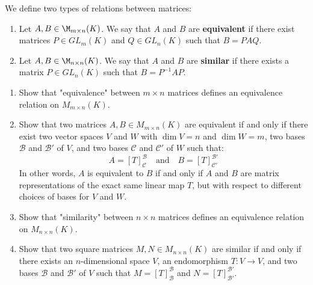 \begin{definition}
\label{def:equivalence_and_similarity}
We define two types of relations between matrices:
\begin{enumerate}
    \item Let $A, B \in \M_{m \times n}(K)$. We say that $A$ and $B$ are \textbf{equivalent} if there exist matrices $P \in GL_m(K)$ and $Q \in GL_n(K)$ such that $B = P A Q$.
    \item Let $A, B \in \M_{n \times n}(K)$. We say that $A$ and $B$ are \textbf{similar} if there exists a matrix $P \in GL_n(K)$ such that $B = P^{-1} A P$.
\end{enumerate}
\end{definition}

\begin{exercise}
\begin{enumerate}
    \item Show that "equivalence" between $m \times n$ matrices defines an equivalence relation on $M_{m \times n}(K)$.
    \item Show that two matrices $A, B \in M_{m \times n}(K)$ are equivalent if and only if there exist two vector spaces $V$ and $W$ with $\dim V = n$ and $\dim W = m$, two bases $\mathcal{B}$ and $\mathcal{B}'$ of $V$, and two bases $\mathcal{C}$ and $\mathcal{C}'$ of $W$ such that:
    \begin{equation*}
        A = [T]_{\mathcal{C}}^{\mathcal{B}} \quad \text{and} \quad B = [T]_{\mathcal{C}'}^{\mathcal{B}'}
    \end{equation*}
    In other words, $A$ is equivalent to $B$ if and only if $A$ and $B$ are matrix representations of the exact same linear map $T$, but with respect to different choices of bases for $V$ and $W$.
    \item Show that "similarity" between $n \times n$ matrices defines an equivalence relation on $M_{n \times n}(K)$.
    \item Show that two square matrices $M, N \in M_{n \times n}(K)$ are similar if and only if there exists an $n$-dimensional space $V$, an endomorphism $T: V \to V$, and two bases $\mathcal{B}$ and $\mathcal{B}'$ of $V$ such that $M = [T]_{\mathcal{B}}^{\mathcal{B}}$ and $N = [T]_{\mathcal{B}'}^{\mathcal{B}'}$.
\end{enumerate}
\end{exercise}

